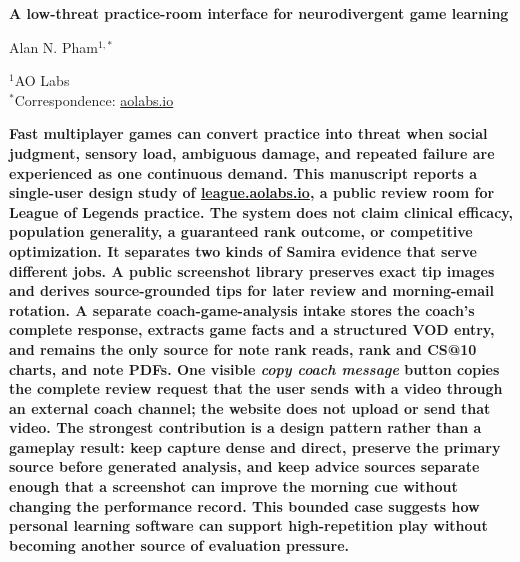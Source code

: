 \documentclass[12pt,letterpaper]{article}
\begin{document}
\linenumbers
\thispagestyle{empty}

\begin{center}
    \vspace*{-0.6em}

    {\fontsize{20}{22}\selectfont\bfseries\color{SumiInk}
    A low-threat practice-room interface for neurodivergent game learning\par}

    \vspace{0.95em}

    {\normalsize\color{SumiInk}
    Alan N. Pham$^{1,*}$\par}

    \vspace{0.38em}

    {\small\color{DustyTaupe}
    $^{1}$AO Labs\\
    $^{*}$Correspondence: \href{https://aolabs.io}{aolabs.io}\par}
\end{center}

\vspace{0.35em}
\noindent\textbf{Fast multiplayer games can convert practice into threat when social judgment, sensory load, ambiguous damage, and repeated failure are experienced as one continuous demand. This manuscript reports a single-user design study of \href{https://league.aolabs.io}{league.aolabs.io}, a public review room for League of Legends practice. The system does not claim clinical efficacy, population generality, a guaranteed rank outcome, or competitive optimization. It separates two kinds of Samira evidence that serve different jobs. A public screenshot library preserves exact tip images and derives source-grounded tips for later review and morning-email rotation. A separate coach-game-analysis intake stores the coach's complete response, extracts game facts and a structured VOD entry, and remains the only source for note rank reads, rank and CS@10 charts, and note PDFs. One visible \emph{copy coach message} button copies the complete review request that the user sends with a video through an external coach channel; the website does not upload or send that video. The strongest contribution is a design pattern rather than a gameplay result: keep capture dense and direct, preserve the primary source before generated analysis, and keep advice sources separate enough that a screenshot can improve the morning cue without changing the performance record. This bounded case suggests how personal learning software can support high-repetition play without becoming another source of evaluation pressure.}
\end{document}
